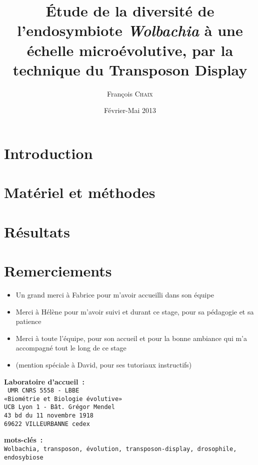\documentclass[a4paper, 12pt, linktocpage=true, oneside]{memoir}
\title{Étude de la diversité de l’endosymbiote \textit{Wolbachia} à une échelle microévolutive, par la technique du Transposon Display}
\date{Février-Mai 2013}
\author{François \textsc{Chaix}}
\renewcommand{\baselinestretch}{1.5}
\begin{document}


\tableofcontents

\chapter{Introduction}


\chapter{Matériel et méthodes}


\chapter{Résultats}


\printbibliography

\chapter*{Remerciements}
\vspace{5cm}
\begin{itemize}
    \item Un grand merci à Fabrice pour m'avoir accueilli dans son équipe
    \item Merci à Hélène pour m'avoir suivi et durant ce stage, pour sa pédagogie et sa patience
    \item Merci à toute l'équipe, pour son accueil et pour la bonne ambiance qui m'a accompagné tout le long de ce stage
    \item \small (mention spéciale à David, pour ses tutoriaux instructifs)
\end{itemize}

\newpage
\pagestyle{empty}
\renewcommand{\baselinestretch}{1} %
\begin{abstract}
    
\end{abstract}
\begin{center}

\vspace{3cm}

\large \textbf{Laboratoire d'accueil~:}\\
\texttt{
\normalsize UMR CNRS 5558 - LBBE\\
«Biométrie et Biologie évolutive»\\
UCB Lyon 1  - Bât. Grégor Mendel\\
43 bd du 11 novembre 1918\\
69622 VILLEURBANNE cedex\\
}
\end{center}
\vfill

\textbf{mots-clés~:}\\
\texttt{Wolbachia, transposon, évolution, transposon-display, drosophile, endosybiose}
\end{document}
